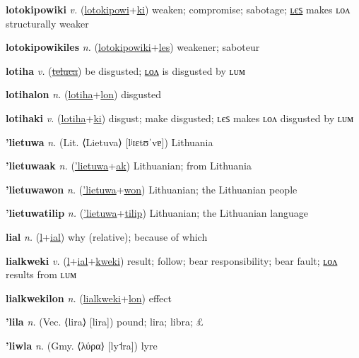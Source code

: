\textbf{\hypertarget{lotokipowiki}{lotokipowiki}} \textit{v.} (\hyperlink{lotokipowi}{lotokipowi}+\allowbreak \hyperlink{ki}{ki})
weaken; compromise; sabotage; \hyperlink{lotokipowikiles}{ʟєꜱ} makes ʟᴏᴧ structurally weaker

\textbf{\hypertarget{lotokipowikiles}{lotokipowikiles}} \textit{n.} (\hyperlink{lotokipowiki}{lotokipowiki}+\allowbreak \hyperlink{les}{les})
weakener; saboteur

\textbf{\hypertarget{lotiha}{lotiha}} \textit{v.} (\hyperlink{teluca}{\sout{teluca}})
be disgusted; \hyperlink{lotihalon}{ʟᴏᴧ} is disgusted by ʟᴜᴍ

\textbf{\hypertarget{lotihalon}{lotihalon}} \textit{n.} (\hyperlink{lotiha}{lotiha}+\allowbreak \hyperlink{lon}{lon})
disgusted

\textbf{\hypertarget{lotihaki}{lotihaki}} \textit{v.} (\hyperlink{lotiha}{lotiha}+\allowbreak \hyperlink{ki}{ki})
disgust; make disgusted; ʟєꜱ makes ʟᴏᴧ disgusted by ʟᴜᴍ

\textbf{\hypertarget{'lietuwa}{'lietuwa}} \textit{n.} (Lit. ⟨Lietuva⟩ [lʲɪɛtʊˈvɐ])
Lithuania

\textbf{\hypertarget{'lietuwaak}{'lietuwaak}} \textit{n.} (\hyperlink{'lietuwa}{'lietuwa}+\allowbreak \hyperlink{ak}{ak})
Lithuanian; from Lithuania

\textbf{\hypertarget{'lietuwawon}{'lietuwawon}} \textit{n.} (\hyperlink{'lietuwa}{'lietuwa}+\allowbreak \hyperlink{won}{won})
Lithuanian; the Lithuanian people

\textbf{\hypertarget{'lietuwatilip}{'lietuwatilip}} \textit{n.} (\hyperlink{'lietuwa}{'lietuwa}+\allowbreak \hyperlink{tilip}{tilip})
Lithuanian; the Lithuanian language

\textbf{\hypertarget{lial}{lial}} \textit{n.} (\hyperlink{l}{l}+\allowbreak \hyperlink{ial}{ial})
why (relative); because of which

\textbf{\hypertarget{lialkweki}{lialkweki}} \textit{v.} (\hyperlink{l}{l}+\allowbreak \hyperlink{ial}{ial}+\allowbreak \hyperlink{kweki}{kweki})
result; follow; bear responsibility; bear fault; \hyperlink{lialkwekilon}{ʟᴏᴧ} results from ʟᴜᴍ

\textbf{\hypertarget{lialkwekilon}{lialkwekilon}} \textit{n.} (\hyperlink{lialkweki}{lialkweki}+\allowbreak \hyperlink{lon}{lon})
effect

\textbf{\hypertarget{'lila}{'lila}} \textit{n.} (Vec. ⟨lira⟩ [lira])
pound; lira; libra; £

\textbf{\hypertarget{'liwla}{'liwla}} \textit{n.} (Gmy. ⟨λύρα⟩ [ly˦ra])
lyre

